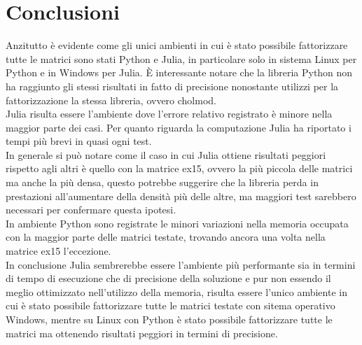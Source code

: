 \documentclass[a4paper, 12pt]{article}
\begin{document}
\section{Conclusioni}
Anzitutto è evidente come gli unici ambienti in cui è stato possibile
fattorizzare tutte le matrici sono stati Python e Julia, in particolare solo in
sistema Linux per Python e in Windows per Julia.
\`E interessante notare che la libreria Python non ha raggiunto gli stessi
risultati in fatto di precisione nonostante utilizzi per la fattorizzazione la
stessa libreria, ovvero cholmod.\\
Julia risulta essere l'ambiente dove l'errore relativo registrato è minore nella
maggior parte dei casi.
Per quanto riguarda la computazione Julia ha riportato i tempi più brevi in
quasi ogni test.\\
In generale si può notare come il caso in cui Julia ottiene risultati peggiori
rispetto agli altri è quello con la matrice ex15, ovvero la più piccola delle
matrici ma anche la più densa, questo potrebbe suggerire che la libreria perda
in prestazioni all'aumentare della densità più delle altre, ma maggiori test
sarebbero necessari per confermare questa ipotesi.\\
In ambiente Python sono registrate le minori variazioni nella memoria occupata
con la maggior parte delle matrici testate, trovando ancora una volta nella
matrice ex15 l'eccezione.\\
In conclusione Julia sembrerebbe essere l'ambiente più performante sia in
termini di tempo di esecuzione che di precisione della soluzione e pur non
essendo il meglio ottimizzato nell'utilizzo della memoria, risulta essere
l'unico ambiente in cui è stato possibile fattorizzare tutte le matrici testate
con sitema operativo Windows, mentre su Linux con Python è stato possibile
fattorizzare tutte le matrici ma ottenendo risultati peggiori in termini di
precisione.
\end{document}
